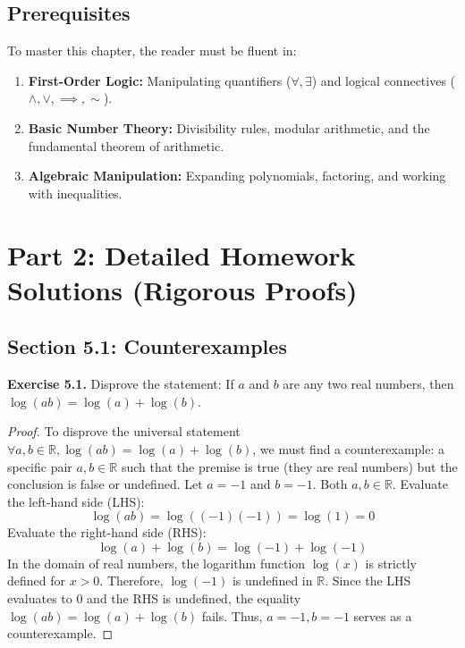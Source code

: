 \documentclass[11pt, letterpaper]{article}
\theoremstyle{remark}
\newcommand{\R}{\mathbb{R}}
\begin{document}
\subsection{Prerequisites}
To master this chapter, the reader must be fluent in:
\begin{enumerate}
    \item \textbf{First-Order Logic:} Manipulating quantifiers ($\forall, \exists$) and logical connectives ($\land, \lor, \implies, \sim$).
    \item \textbf{Basic Number Theory:} Divisibility rules, modular arithmetic, and the fundamental theorem of arithmetic.
    \item \textbf{Algebraic Manipulation:} Expanding polynomials, factoring, and working with inequalities.
\end{enumerate}

\newpage
\section{Part 2: Detailed Homework Solutions (Rigorous Proofs)}

\subsection{Section 5.1: Counterexamples}

\textbf{Exercise 5.1.} Disprove the statement: If $a$ and $b$ are any two real numbers, then $\log(ab) = \log(a) + \log(b)$.
\begin{proof}
To disprove the universal statement $\forall a, b \in \R, \log(ab) = \log(a) + \log(b)$, we must find a counterexample: a specific pair $a, b \in \R$ such that the premise is true (they are real numbers) but the conclusion is false or undefined.
Let $a = -1$ and $b = -1$. Both $a, b \in \R$.
Evaluate the left-hand side (LHS):
\[ \log(ab) = \log((-1)(-1)) = \log(1) = 0 \]
Evaluate the right-hand side (RHS):
\[ \log(a) + \log(b) = \log(-1) + \log(-1) \]
In the domain of real numbers, the logarithm function $\log(x)$ is strictly defined for $x > 0$. Therefore, $\log(-1)$ is undefined in $\R$.
Since the LHS evaluates to $0$ and the RHS is undefined, the equality $\log(ab) = \log(a) + \log(b)$ fails. Thus, $a = -1, b = -1$ serves as a counterexample.
\end{proof}
\end{document}
